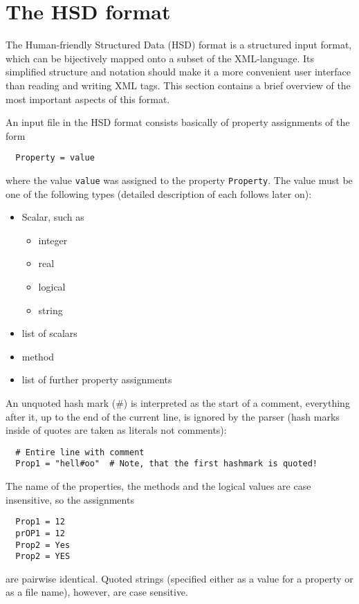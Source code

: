 \chapter{The HSD format}
\label{sec:hsd}

The Human-friendly Structured Data (HSD) format is a structured input
format, which can be bijectively mapped onto a subset of the
XML-language. Its simplified structure and notation should make it a
more convenient user interface than reading and writing XML tags. This
section contains a brief overview of the most important aspects of
this format.

An input file in the HSD format consists basically of property
assignments of the form
\begin{verbatim}
  Property = value
\end{verbatim}
where the value \verb|value| was assigned to the property
\verb|Property|.  The value must be one of the following types
(detailed description of each follows later on):
\begin{itemize}
\item Scalar, such as
  \begin{itemize}
  \item integer
  \item real
  \item logical
  \item string
  \end{itemize}
\item list of scalars
\item method
\item list of further property assignments
\end{itemize}

An unquoted hash mark (\#) is interpreted as the start of a comment,
everything after it, up to the end of the current line, is ignored by
the parser (hash marks inside of quotes are taken as literals not
comments):
\begin{verbatim}
  # Entire line with comment
  Prop1 = "hell#oo"  # Note, that the first hashmark is quoted!
\end{verbatim}
The name of the properties, the methods and the logical values are case
insensitive, so the assignments
\begin{verbatim}
  Prop1 = 12
  prOP1 = 12
  Prop2 = Yes
  Prop2 = YES
\end{verbatim}
are pairwise identical. Quoted strings (specified either as a value
for a property or as a file name), however, are case sensitive.

